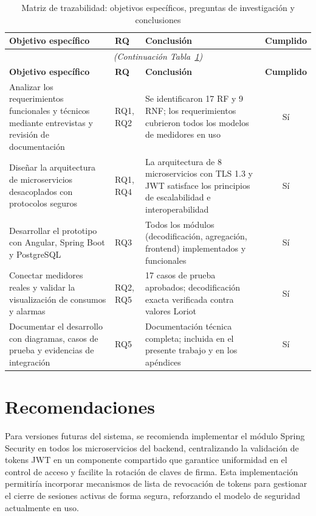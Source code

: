 \documentclass[12pt,a4paper,oneside]{report}
\begin{document}
\begin{longtable}{p{4.5cm}lp{5.5cm}c}
\caption{Matriz de trazabilidad: objetivos específicos, preguntas de investigación y conclusiones}\label{tab:trazabilidad} \\
\toprule
\textbf{Objetivo específico} & \textbf{RQ} & \textbf{Conclusión} & \textbf{Cumplido} \\
\midrule
\endfirsthead
\multicolumn{4}{c}{\textit{(Continuación Tabla~\ref{tab:trazabilidad})}} \\
\toprule
\textbf{Objetivo específico} & \textbf{RQ} & \textbf{Conclusión} & \textbf{Cumplido} \\
\midrule
\endhead
\bottomrule
\endlastfoot
Analizar los requerimientos funcionales y técnicos mediante entrevistas y revisión de documentación & RQ1, RQ2 & Se identificaron 17 RF y 9 RNF; los requerimientos cubrieron todos los modelos de medidores en uso & Sí \\
Diseñar la arquitectura de microservicios desacoplados con protocolos seguros & RQ1, RQ4 & La arquitectura de 8 microservicios con TLS 1.3 y JWT satisface los principios de escalabilidad e interoperabilidad & Sí \\
Desarrollar el prototipo con Angular, Spring Boot y PostgreSQL & RQ3 & Todos los módulos (decodificación, agregación, frontend) implementados y funcionales & Sí \\
Conectar medidores reales y validar la visualización de consumos y alarmas & RQ2, RQ5 & 17 casos de prueba aprobados; decodificación exacta verificada contra valores Loriot & Sí \\
Documentar el desarrollo con diagramas, casos de prueba y evidencias de integración & RQ5 & Documentación técnica completa; incluida en el presente trabajo y en los apéndices & Sí \\
\end{longtable}

\section{\texorpdfstring{Recomendaciones }{Recomendaciones }}\label{recomendaciones}

Para versiones futuras del sistema, se recomienda implementar el módulo Spring Security en todos los microservicios del backend, centralizando la validación de tokens JWT en un componente compartido que garantice uniformidad en el control de acceso y facilite la rotación de claves de firma. Esta implementación permitiría incorporar mecanismos de lista de revocación de tokens para gestionar el cierre de sesiones activas de forma segura, reforzando el modelo de seguridad actualmente en uso.
\end{document}
